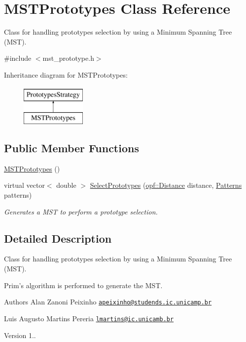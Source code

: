 \hypertarget{classMSTPrototypes}{\section{M\+S\+T\+Prototypes Class Reference}
\label{classMSTPrototypes}
}


Class for handling prototypes selection by using a Minimum Spanning Tree (M\+S\+T).  




{\ttfamily \#include $<$mst\+\_\+prototype.\+h$>$}

Inheritance diagram for M\+S\+T\+Prototypes\+:\begin{figure}[H]
\begin{center}
\leavevmode
\includegraphics[height=2.000000cm]{classMSTPrototypes}
\end{center}
\end{figure}
\subsection*{Public Member Functions}
\begin{DoxyCompactItemize}
\item 
\hyperlink{classMSTPrototypes_a62fedec88ad4ab417181fbc672f72410}{M\+S\+T\+Prototypes} ()
\item 
virtual vector$<$ double $>$ \hyperlink{classMSTPrototypes_a654ccbaebfdbca73a0da0e5eb1e4e39f}{Select\+Prototypes} (\hyperlink{namespaceopf_a61631393754e0aa6aaeacf0767b2b419}{opf\+::\+Distance} distance, \hyperlink{classPatterns}{Patterns} patterns)
\begin{DoxyCompactList}\small\item\em Generates a M\+S\+T to perform a prototype selection. \end{DoxyCompactList}\end{DoxyCompactItemize}


\subsection{Detailed Description}
Class for handling prototypes selection by using a Minimum Spanning Tree (M\+S\+T). 

Prim's algorithm is performed to generate the M\+S\+T. \begin{DoxyAuthor}{Authors}
Alan Zanoni Peixinho \href{mailto:apeixinho@studends.ic.unicamp.br}{\tt apeixinho@studends.\+ic.\+unicamp.\+br} 

Luis Augusto Martins Pereria \href{mailto:lmartins@ic.unicamb.br}{\tt lmartins@ic.\+unicamb.\+br} 
\end{DoxyAuthor}
\begin{DoxyVersion}{Version}
1.. 
\end{DoxyVersion}


